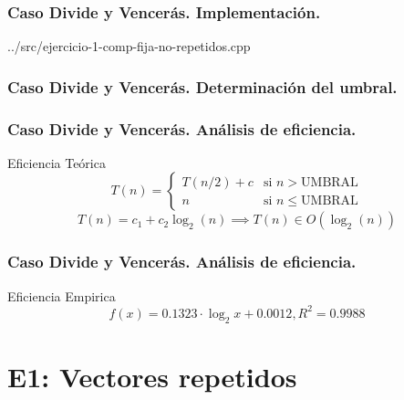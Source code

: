 \documentclass[13pt]{beamer}
\begin{document}
	\begin{frame}
		\frametitle{Caso Divide y Vencerás. Implementación.}
		
		{../src/ejercicio-1-comp-fija-no-repetidos.cpp} 
	\end{frame}

	\begin{frame}
		\frametitle{Caso Divide y Vencerás. Determinación del umbral.}
	\end{frame}

	\begin{frame}
	\frametitle{Caso Divide y Vencerás. Análisis de eficiencia.}
		\begin{block}{Eficiencia Teórica}
			\begin{equation}
			T(n) = \left\{ \begin{array}{lr} T(n/2) + c & \text{si } n > \text{UMBRAL}\\ n & \text{si } n \leqslant \text{UMBRAL} \end{array} \right.
			\label{eq:1a-efi-dyv-rec}
			\end{equation}
			\begin{equation}
			T(n) = c_{1} + c_{2} \log_2(n) \implies \boxed{T(n) \in O(\log_2(n))}
			\label{eq:1a-eficiencia-lineal}
			\end{equation}
		\end{block}
	\end{frame}

	\begin{frame}
		\frametitle{Caso Divide y Vencerás. Análisis de eficiencia.}
		\begin{block}{Eficiencia Empirica}
			\begin{equation}
			\boxed{f(x) = 0.1323 \cdot \log_{2}{x} + 0.0012, R^2 = 0.9988}
			\label{eq:1a-dyv-regresion}
			\end{equation}
		\end{block}
	\end{frame}

    \section{E1: Vectores repetidos}
\end{document}
